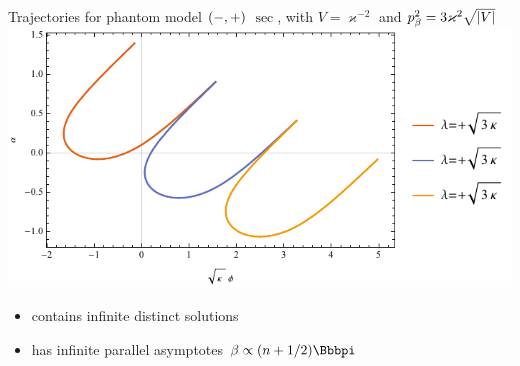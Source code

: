 \documentclass[8pt]{beamer}
\begin{document}
\begin{frame}%
{Trajectories for phantom model ${\left(-,+\right)}$}%
{$\sec$, with $V = \varkappa^{-2}$ and
$p_\beta^2 = 3\varkappa^2\sqrt{{\left|V\right|}}$}
\includegraphics[width=\textwidth]{../plots.nb/csc_lamb_l.pdf}
\begin{itemize}
	\item contains infinite distinct solutions
	\item has infinite parallel asymptotes $\beta \propto \rbr{n+1/2}\pp $
\end{itemize}
\end{frame}
\end{document}
